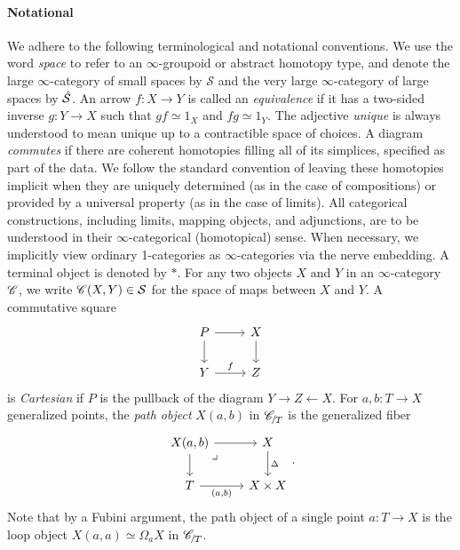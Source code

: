 \documentclass[twoside,a4paper,11pt]{amsart}
\begin{document}
\paragraph{\textbf{Notational}}
We adhere to the following terminological and notational conventions. We use the word \emph{space} to refer to an $\infty$-groupoid or abstract homotopy type, and denote the large $\infty$-category of small spaces by $\mathcal{S}$ and the very large $\infty$-category of large
spaces by $\hat{\mathcal{S}}$. An arrow $f\colon X\to Y$ is called an \emph{equivalence} if it has a two-sided inverse $g\colon Y\to X$ such that $gf\simeq 1_X$ and $fg\simeq 1_Y$. The adjective \emph{unique} is always understood to mean unique up to a contractible space of choices. A diagram \emph{commutes} if there are coherent homotopies filling all of its simplices, specified as part of the data. We follow the standard convention of leaving these homotopies implicit when they are uniquely determined (as in the case of compositions) or provided by a universal property (as in the case of limits). All categorical constructions, including limits, mapping objects, and adjunctions, are to be understood in their $\infty$-categorical (homotopical) sense. When necessary, we implicitly view ordinary 1-categories as $\infty$-categories via the nerve embedding. A terminal object is denoted by $\ast$. For any two objects $X$ and $Y$ in an $\infty$-category $\mathscr{C}$, we write $\mathscr{C}(X,Y)\in\mathcal{S}$ for the space of maps between $X$ and $Y$. A commutative square 
\begin{equation}\label{eq: Cartesian square}
  \begin{tikzcd}
	P & X \\
	Y & Z
	\arrow[from=1-1, to=1-2]
	\arrow[from=1-1, to=2-1]
	\arrow[from=1-2, to=2-2]
	\arrow[from=2-1, to=2-2, "f"]
\end{tikzcd}
\end{equation}
is \textit{Cartesian} if $P$ is the pullback of the diagram $Y\to Z\leftarrow X$. For $a,b\colon T\to X$ generalized points, the \textit{path object} $X(a,b)$ in $\slice{\C}{T}$ is the generalized fiber
\begin{equation}\label{definition: path objects}
    \begin{tikzcd}
    {X(a,b)} \arrow[r] \arrow[d] \arrow[dr, phantom, "\lrcorner"{anchor=center, pos=0.125}] & X \arrow[d, "\Delta"] \\
    T \arrow[r, "{(a,b)}"'] & {X \times X}
\end{tikzcd}.
\end{equation}
Note that by a Fubini argument, the path object of a single point $a\colon T\to X$ is the loop object $X(a,a)\simeq\Omega_aX$ in $\slice{\C}{T}$.
\end{document}
